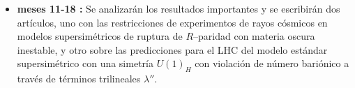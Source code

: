 \begin{itemize}
\item {\bf meses 11-18 : } Se analizarán los resultados importantes y se escribirán dos artículos, uno con las restricciones de experimentos de rayos cósmicos en modelos supersimétricos de ruptura de $R$--paridad con materia oscura inestable, y otro sobre las predicciones para el LHC del modelo estándar supersimétrico con una simetría $U(1)_H$ con violación de número bariónico a través de términos trilineales $\lambda''$.

\end{itemize}


